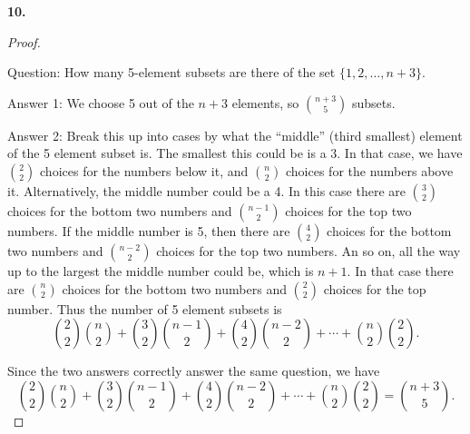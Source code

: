 \documentclass[10pt,]{book}
\theoremstyle{plain}
\theoremstyle{definition}
\theoremstyle{definition}
\theoremstyle{definition}
\numberwithin{equation}{chapter}
\begin{document}
\noindent\textbf{10.}\quad{}\begin{proof}\hypertarget{proof-12}{}

            Question: How many 5-element subsets are there of the set \(\{1,2,\ldots, n+3\}\).
\par

            Answer 1: We choose 5 out of the \(n+3\) elements, so \({n+3 \choose 5}\) subsets.
\par

            Answer 2: Break this up into cases by what the ``middle'' (third smallest) element of the 5 element subset is. The smallest this could be is a 3. In that case, we have \({2 \choose 2}\) choices for the numbers below it, and \({n \choose 2}\) choices for the numbers above it. Alternatively, the middle number could be a 4. In this case there are \({3 \choose 2}\) choices for the bottom two numbers and \({n-1 \choose 2}\) choices for the top two numbers. If the middle number is 5, then there are \({4 \choose 2}\) choices for the bottom two numbers and \({n-2 \choose 2}\) choices for the top two numbers. An so on, all the way up to the largest the middle number could be, which is \(n+1\). In that case there are \({n \choose 2}\) choices for the bottom two numbers and \({2 \choose 2}\) choices for the top number. Thus the number of 5 element subsets is
            \begin{equation*}
              {2 \choose 2}{n \choose 2} + {3 \choose 2}{n-1 \choose 2} + {4\choose 2}{n-2 \choose 2} + \cdots + {n\choose 2}{2\choose 2}.
            \end{equation*}
\par

            Since the two answers correctly answer the same question, we have
            \begin{equation*}
              {2 \choose 2}{n \choose 2} + {3 \choose 2}{n-1 \choose 2} + {4\choose 2}{n-2 \choose 2} + \cdots + {n\choose 2}{2\choose 2} = {n+3 \choose 5}.
            \end{equation*}
\end{proof}
\par\smallskip
\end{document}
